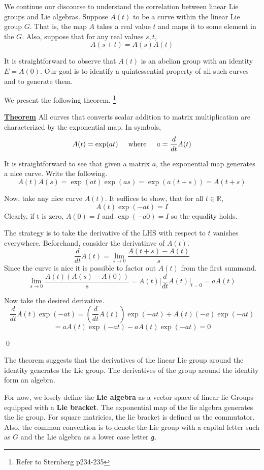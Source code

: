 \documentclass{article}
\newcommand{\new}[1]{
    \vspace{2mm}
    \noindent
    \textbf{
    \underline{#1}}
}
\newcommand{\textWhere}{
    {
        \hspace{5mm}
        \textrm{where}
        \hspace{5mm}
    }
}
\begin{document}
We continue our discourse to understand the correlation between 
linear Lie groups and Lie algebras. 
Suppose $A(t)$ to be a curve within the linear Lie group $G$.
That is, the map $A$ takes a real value $t$ and maps it to 
some element in the $G$. Also, suppose that for any real values $s, t$, 
\[
    A(s + t) = A(s) A(t)
\]

It is straightforward to observe that $A(t)$ is an abelian group 
with an identity $E = A(0)$. Our goal is to identify a quintessential 
property of all such curves and to generate them. 

We present the following theorem. 
\footnote{Refer to Sternberg p234-235}

\new{Theorem} All curves that converts scalar addition to 
matrix multiplication are characterized by the exponential map. 
In symbols, 
\[
    A(t) = \exp(at) \textWhere a = \frac d {dt} A(t)
\]



\proof 
It is straightforward to see that given a matrix $a$, the exponential 
map generates a nice curve. Write the following. 
\[
    A(t) A(s) = \exp(at)\exp(as) = \exp(a (t + s)) = A(t + s)
\]

Now, take any nice curve $A(t)$. It suffices to show, that for all 
$t \in \mathbb R$, 
\[
    A(t) \exp(-at) = I
\]
Clearly, if t is zero, $A(0) = I$ and $\exp(-a0) = I$ so the 
equality holds. 

The strategy is to take the derivative of the LHS with respect to 
$t$ vanishes everywhere. Beforehand, consider the derivatinve 
of $A(t)$. 
\[
    \frac d {dt} A(t) 
    = \lim_{s \rightarrow 0} \frac {A(t + s) - A(t)} s 
\]
Since the curve is nice it is possible to factor out $A(t)$ from 
the first summand. 
\[\lim_{s \rightarrow 0} \frac {A(t)(A(s) - A(0))} s 
    = A(t) \bigg[ \frac d {dt} A(t) \bigg] _{t = 0} = a A(t)
\]

Now take the desired derivative. 
\[
    \frac d {dt} A(t) \exp(-at) = 
    \left(
         \frac d {dt} A(t)
    \right) \exp(-at)
    + 
    A(t) (-a) \exp(-at)
\]
\[
    = a A(t) \exp(-at) - a A(t) \exp(-at) = 0
\]

\hfill 
\qed

The theorem suggests that the derivatives of the linear Lie group 
around the identity generates the Lie group. The derivatives of 
the group around the identity form an algebra. 

For now, we losely define the \textbf{Lie algebra} as a vector space of linear 
lie Groups equipped with a \textbf{Lie bracket}. The exponential map of 
the lie algebra generates the lie group. For square matricies, 
the lie bracket is defined as the commutator. Also, the common 
convention is to denote the Lie group with a capital letter such 
as $G$ and the Lie algebra as a lower case letter $\mathfrak g$. 
\end{document}
